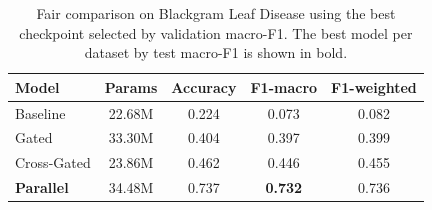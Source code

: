 \begin{table}[t]
\centering
\caption{Fair comparison on Blackgram Leaf Disease using the best checkpoint selected by validation macro-F1. The best model per dataset by test macro-F1 is shown in bold.}
\label{tab:dino_fair_blackgram_leaf_disease}
\begin{tabular}{lcccc}
\toprule
\textbf{Model} & \textbf{Params} & \textbf{Accuracy} & \textbf{F1-macro} & \textbf{F1-weighted}\\
\midrule
Baseline & 22.68M & 0.224 & 0.073 & 0.082\\
Gated & 33.30M & 0.404 & 0.397 & 0.399\\
Cross-Gated & 23.86M & 0.462 & 0.446 & 0.455\\
\textbf{Parallel} & 34.48M & 0.737 & \textbf{0.732} & 0.736\\
\bottomrule
\end{tabular}
\end{table}